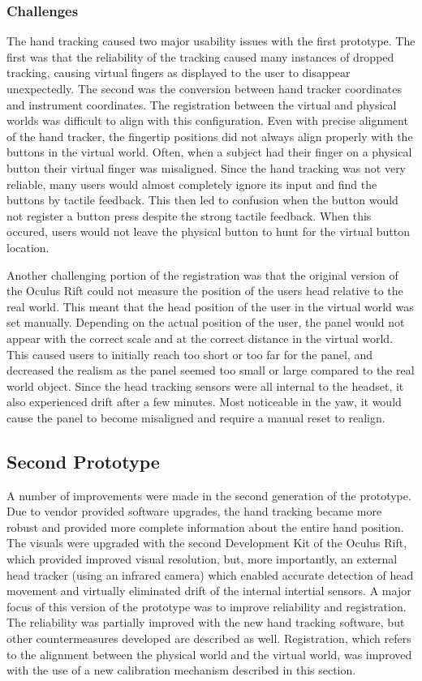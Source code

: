 \subsubsection{Challenges}

The hand tracking caused two major usability issues with the first prototype.
The first was that the reliability of the tracking caused many instances of dropped tracking, causing virtual fingers as displayed to the user to disappear unexpectedly.
The second was the conversion between hand tracker coordinates and instrument coordinates.
The registration between the virtual and physical worlds was difficult to align with this configuration.
Even with precise alignment of the hand tracker, the fingertip positions did not always align properly with the buttons in the virtual world.
Often, when a subject had their finger on a physical button their virtual finger was misaligned.
Since the hand tracking was not very reliable, many users would almost completely ignore its input and find the buttons by tactile feedback.
This then led to confusion when the button would not register a button press despite the strong tactile feedback.
When this occured, users would not leave the physical button to hunt for the virtual button location.

Another challenging portion of the registration was that the original version of the Oculus Rift could not measure the position of the users head relative to the real world.
This meant that the head position of the user in the virtual world was set manually.
Depending on the actual position of the user, the panel would not appear with the correct scale and at the correct distance in the virtual world.
This caused users to initially reach too short or too far for the panel, and decreased the realism as the panel seemed too small or large compared to the real world object.
Since the head tracking sensors were all internal to the headset, it also experienced drift after a few minutes.
Most noticeable in the yaw, it would cause the panel to become misaligned and require a manual reset to realign.

\subsection{Second Prototype}

A number of improvements were made in the second generation of the prototype.
Due to vendor provided software upgrades, the hand tracking became more robust and provided more complete information about the entire hand position.
The visuals were upgraded with the second Development Kit of the Oculus Rift, which provided improved visual resolution, but, more importantly, an external head tracker (using an infrared camera) which enabled accurate detection of head movement and virtually eliminated drift of the internal intertial sensors.
A major focus of this version of the prototype was to improve reliability and registration.
The reliability was partially improved with the new hand tracking software, but other countermeasures developed are described as well.
Registration, which refers to the alignment between the physical world and the virtual world, was improved with the use of a new calibration mechanism described in this section.

